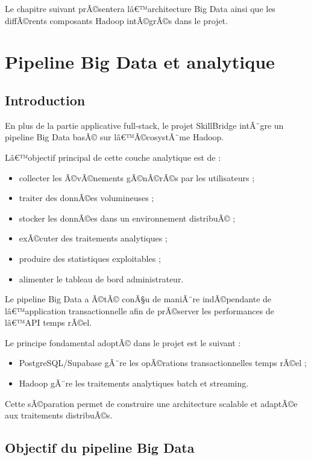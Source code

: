 ﻿\documentclass[12pt,a4paper]{report}
\begin{document}
Le chapitre suivant prÃ©sentera lâ€™architecture Big Data ainsi que les diffÃ©rents composants Hadoop intÃ©grÃ©s dans le projet.

\chapter{Pipeline Big Data et analytique}

\section{Introduction}

En plus de la partie applicative full-stack, le projet SkillBridge intÃ¨gre un pipeline Big Data basÃ© sur lâ€™Ã©cosystÃ¨me Hadoop.

Lâ€™objectif principal de cette couche analytique est de :
\begin{itemize}
    \item collecter les Ã©vÃ©nements gÃ©nÃ©rÃ©s par les utilisateurs ;
    \item traiter des donnÃ©es volumineuses ;
    \item stocker les donnÃ©es dans un environnement distribuÃ© ;
    \item exÃ©cuter des traitements analytiques ;
    \item produire des statistiques exploitables ;
    \item alimenter le tableau de bord administrateur.
\end{itemize}

Le pipeline Big Data a Ã©tÃ© conÃ§u de maniÃ¨re indÃ©pendante de lâ€™application transactionnelle afin de prÃ©server les performances de lâ€™API temps rÃ©el.

Le principe fondamental adoptÃ© dans le projet est le suivant :
\begin{itemize}
    \item PostgreSQL/Supabase gÃ¨re les opÃ©rations transactionnelles temps rÃ©el ;
    \item Hadoop gÃ¨re les traitements analytiques batch et streaming.
\end{itemize}

Cette sÃ©paration permet de construire une architecture scalable et adaptÃ©e aux traitements distribuÃ©s.

\section{Objectif du pipeline Big Data}
\end{document}
